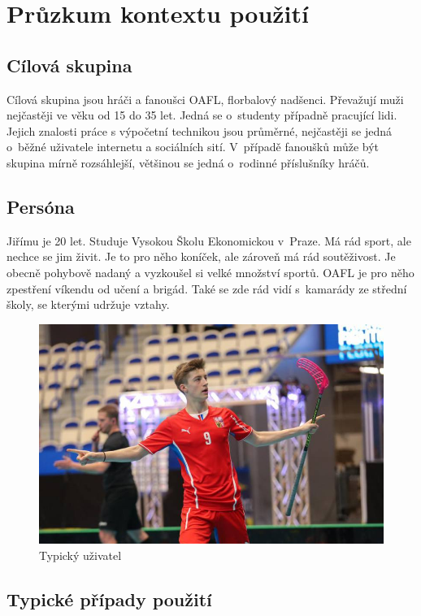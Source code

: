 \documentclass[11pt, a4paper, titlepage]{article}
\begin{document}

\section{Průzkum kontextu použití}

\subsection{Cílová skupina}

Cílová skupina jsou hráči a fanoušci OAFL, florbalový nadšenci. Převažují muži nejčastěji ve věku od 15 do 35 let. Jedná se o~studenty případně pracující lidi. Jejich znalosti práce s výpočetní technikou jsou průměrné, nejčastěji se jedná o~běžné uživatele internetu a sociálních sití. V~případě fanoušků může být skupina mírně rozsáhlejší, většinou se jedná o~rodinné příslušníky hráčů.

\subsection{Persóna}

Jiřímu je 20 let. Studuje Vysokou Školu Ekonomickou v~Praze. Má rád sport, ale nechce se jim živit. Je to pro něho koníček, ale zároveň má rád soutěživost. Je obecně pohybově nadaný a vyzkoušel si velké množství sportů. OAFL je pro něho zpestření víkendu od učení a brigád. Také se zde rád vidí s~kamarády ze střední školy, se kterými udržuje vztahy.

\begin{figure}[H]
    \centering
    \includegraphics[width=.70\textwidth]{images/persona.jpg}\hfill
    \caption{Typický uživatel}
    \label{fig:persona}
\end{figure}


\subsection{Typické případy použití}
\end{document}
